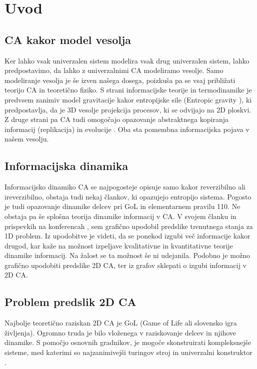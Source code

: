 \documentclass[12pt,a4paper,openany,twoside]{book}
\begin{document}

\chapter{Uvod}

\section{CA kakor model vesolja}

Ker lahko vsak univerzalen sistem modelira vsak drug univerzalen sistem, lahko predpostavimo,
da lahko z univerzalnimi CA modeliramo vesolje. Samo modeliranje vesolja
je še izven našega dosega, poizkuša pa se vsaj približati teorijo CA in teoretično fiziko.
S strani informacijske teorije in termodinamike je predvsem zanimiv model gravitacije
kakor entropijske sile (Entropic gravity \cite{Verlinde2010}), ki predpostavlja, da je
3D vesolje projekcija procesov, ki se odvijajo na 2D ploskvi. Z druge strani pa CA tudi omogočajo
opazovanje abstraktnega kopiranja informacij (replikacija) in evolucije \cite{Salzberg2004}.
Oba sta pomembna informacijska pojava v našem vesolju.

\section{Informacijska dinamika}

Informacijsko dinamiko CA se najpogosteje opisuje samo kakor reverzibilno ali ireverzibilno,
obstaja tudi nekaj člankov, ki opazujejo entropijo sistema.
Pogosto je tudi opazovanje dinamike delcev pri GoL in elementarnem pravilu 110.
Ne obstaja pa še splošna teorija dinamike informacij v CA.
V svojem članku \cite{JerasDobnikar2007} in prispevkih na konferencah \cite{DBLP:conf/iccS/JerasD06, DBLP:conf/automata/Jeras08, Jeras2008-pyca},
sem grafično upodobil predslike trenutnega stanja za 1D problem.
Iz upodobitve je videti, da se ponekod izgubi več informacije kakor drugod,
kar kaže na možnost izpeljave kvalitativne in kvantitativne teorije dinamike informacij.
Na žalost se ta možnost še ni udejanila. Podobno je možno grafično upodobiti predslike 2D CA,
ter iz grafov sklepati o izgubi informacij v 2D CA.

\section{Problem predslik 2D CA}

Najbolje teoretično raziskan 2D CA je GoL (Game of Life ali slovensko igra življenja).
Ogromno truda je bilo vloženega v raziskovanje delcev in njihove dinamike. S pomočjo
osnovnih gradnikov, je mogoče skonstruirati kompleksnejše sisteme, med katerimi so
najzanimivejši turingov stroj \cite{Rendell2001} in univerzalni konstruktor \cite{Greene2013}.
\end{document}
